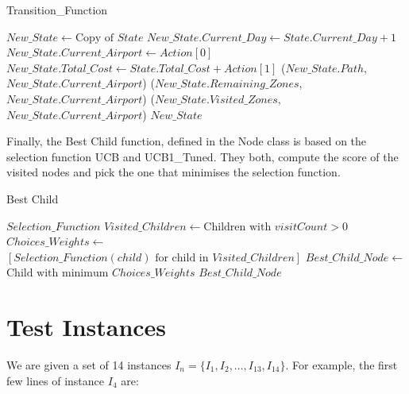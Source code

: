 \documentclass[conference]{IEEEtran}
\begin{document}
\begin{algorithm}
    \caption{Transition\_Function}
    \label{alg:TransitionFunction}
    \begin{algorithmic}[1]
        \STATE $New\_State \leftarrow \text{Copy of } State$
        \STATE $New\_State.Current\_Day \leftarrow State.Current\_Day + 1$
        \STATE $New\_State.Current\_Airport \leftarrow Action[0]$
        \STATE $New\_State.Total\_Cost \leftarrow State.Total\_Cost + Action[1]$
        \STATE {}($New\_State.Path$, $New\_State.Current\_Airport$)
        \STATE {}($New\_State.Remaining\_Zones$, $New\_State.Current\_Airport$)
        \STATE {}($New\_State.Visited\_Zones$, $New\_State.Current\_Airport$)
        \RETURN $New\_State$
    \end{algorithmic}
\end{algorithm}

Finally, the Best Child function, defined in the Node class is based on the selection function UCB and UCB1\_Tuned. They both, compute the score of the visited nodes and pick the one that minimises the selection function.

\begin{algorithm}
    \caption{Best Child}
    \label{alg:Best Child}
    \begin{algorithmic}[1]
        \REQUIRE $Selection\_Function$
        \STATE $Visited\_Children \leftarrow \text{Children with } visitCount > 0$
        \STATE $Choices\_Weights \leftarrow$ 
        \\ $\left[ Selection\_Function(child) \text{ for child in } Visited\_Children \right]$
        \STATE $Best\_Child\_Node \leftarrow$ \\ $\text{Child with minimum } Choices\_Weights$
        \RETURN $Best\_Child\_Node$
    \end{algorithmic}
\end{algorithm}

\section{Test Instances}

We are given a set of 14 instances \( I_{n} = \{I_1, I_2, \ldots, I_{13}, I_{14}\} \). For example, the first few lines of instance \( I_4 \) are:
\end{document}

